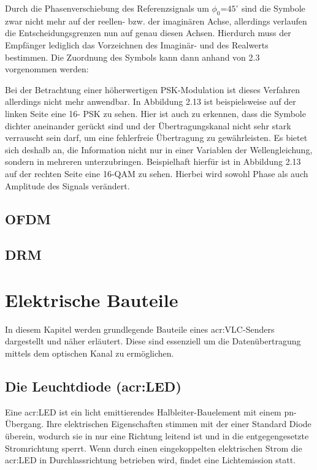 Durch die Phasenverschiebung des Referenzsignals um $\phi_0$=$45^\circ$ sind die Symbole zwar
nicht mehr auf der reellen- bzw. der imaginären Achse, allerdings verlaufen die Entscheidungsgrenzen nun auf genau diesen Achsen. Hierdurch muss der Empfänger lediglich das Vorzeichnen des Imaginär- und des Realwerts bestimmen. Die Zuordnung des Symbols kann dann anhand von 2.3 vorgenommen werden:



Bei der Betrachtung einer höherwertigen PSK-Modulation ist dieses Verfahren allerdings
nicht mehr anwendbar. In Abbildung 2.13 ist beispielsweise auf der linken Seite eine 16-
PSK zu sehen. Hier ist auch zu erkennen, dass die Symbole dichter aneinander gerückt
sind und der Übertragungskanal nicht sehr stark verrauscht sein darf, um eine fehlerfreie
Übertragung zu gewährleisten. Es bietet sich deshalb an, die Information nicht nur in einer
Variablen der Wellengleichung, sondern in mehreren unterzubringen. Beispielhaft hierfür
ist in Abbildung 2.13 auf der rechten Seite eine 16-QAM zu sehen. Hierbei wird sowohl
Phase als auch Amplitude des Signals verändert.
\subsection{OFDM}
\label{subsec:Unterabschnitt1}
\subsection{DRM}
\label{subsec:Unterabschnitt1}

\section{Elektrische Bauteile}
\label{subsec:Unterabschnitt1}
In diesem Kapitel werden grundlegende Bauteile eines \gls{acr:VLC}-Senders dargestellt und näher erläutert. Diese sind essenziell um die Datenübertragung mittels dem optischen Kanal zu ermöglichen.

\subsection{Die Leuchtdiode (\gls{acr:LED})}
\label{subsub:Unterunterabschnitt1}


Eine \gls{acr:LED} ist ein licht emittierendes Halbleiter-Bauelement mit einem pn-Übergang. Ihre elektrischen Eigenschaften stimmen mit der einer Standard Diode überein, wodurch sie in nur eine Richtung leitend ist und in die entgegengesetzte Stromrichtung sperrt. Wenn durch einen eingekoppelten elektrischen Strom die \gls{acr:LED} in Durchlassrichtung betrieben wird, findet eine Lichtemission statt.\cite{slabke} 

